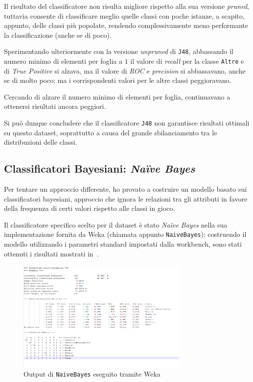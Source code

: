 \documentclass[a4paper,11pt,twoside,notitlepage,final]{scrartcl}
\begin{document}
Il risultato del classificatore non risulta migliore rispetto alla sua versione \emph{pruned}, tuttavia consente di classificare meglio quelle classi con poche istanze,
a scapito, appunto, delle classi più popolate, rendendo complessivamente meno performante la classificazione (anche se di poco).

Sperimentando ulteriormente con la versione \emph{unpruned} di \texttt{J48},
abbassando il numero minimo di elementi per foglia a \(1\) il valore di \emph{recall} per la classe \texttt{Altre} e di \emph{True Positive} si alzava,
ma il valore di \emph{ROC} e \emph{precision} si abbassavano, anche se di molto poco; ma i corrispondenti valori per le altre classi peggioravano.

Cercando di alzare il numero minimo di elementi per foglia, continuavano a ottenersi risultati ancora peggiori.

Si può dunque concludere che il classificatore \texttt{J48} non garantisce risultati ottimali su questo dataset, soprattutto a causa del grande sbilanciamento tra le distribuzioni delle classi.

\subsection{Classificatori Bayesiani: \emph{Naïve Bayes}}\label{subsec:bayes}

Per tentare un approccio differente, ho provato a costruire un modello basato sui classificatori bayesiani,
approccio che ignora le relazioni tra gli attributi in favore della frequenza di certi valori rispetto alle classi in gioco.

Il classificatore specifico scelto per il dataset è stato \emph{Naïve Bayes} nella sua implementazione fornita da Weka (chiamata appunto \texttt{NaiveBayes});
costruendo il modello utilizzando i parametri standard impostati dalla workbench, sono stati ottenuti i risultati mostrati in~.


\begin{figure}[H]
  \centering
  \includegraphics[width=0.75\textwidth]{fig/bayes.PNG}%
  \caption{Output di \texttt{NaiveBayes} eseguito tramite Weka}%
  \label{fig:bayes}
\end{figure}
\end{document}

